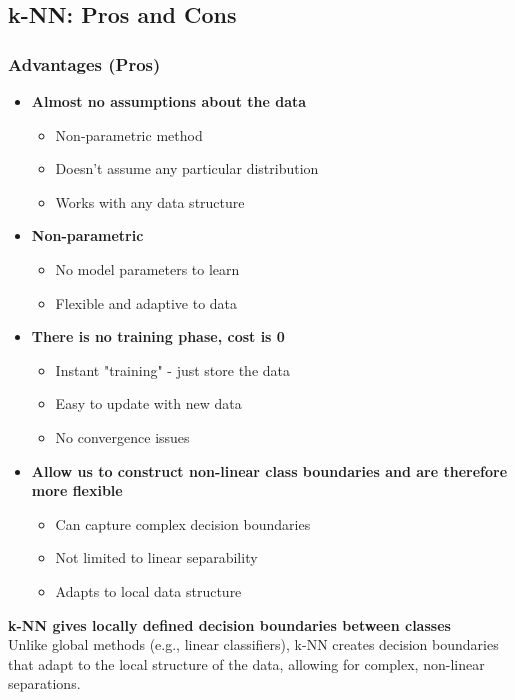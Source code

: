 \documentclass[11pt,a4paper]{article}
\theoremstyle{definition}
\theoremstyle{plain}
\theoremstyle{remark}
\begin{document}
\subsection{k-NN: Pros and Cons}

\subsubsection{Advantages (Pros)}

\begin{itemize}
    \item \textbf{Almost no assumptions about the data}
    \begin{itemize}
        \item Non-parametric method
        \item Doesn't assume any particular distribution
        \item Works with any data structure
    \end{itemize}
    
    \item \textbf{Non-parametric}
    \begin{itemize}
        \item No model parameters to learn
        \item Flexible and adaptive to data
    \end{itemize}
    
    \item \textbf{There is no training phase, cost is 0}
    \begin{itemize}
        \item Instant "training" - just store the data
        \item Easy to update with new data
        \item No convergence issues
    \end{itemize}
    
    \item \textbf{Allow us to construct non-linear class boundaries and are therefore more flexible}
    \begin{itemize}
        \item Can capture complex decision boundaries
        \item Not limited to linear separability
        \item Adapts to local data structure
    \end{itemize}
\end{itemize}

\begin{center}
\colorbox{green!15}{\parbox{0.9\textwidth}{
\textbf{k-NN gives locally defined decision boundaries between classes}\\[0.2cm]
Unlike global methods (e.g., linear classifiers), k-NN creates decision boundaries that adapt to the local structure of the data, allowing for complex, non-linear separations.
}}
\end{center}
\end{document}
